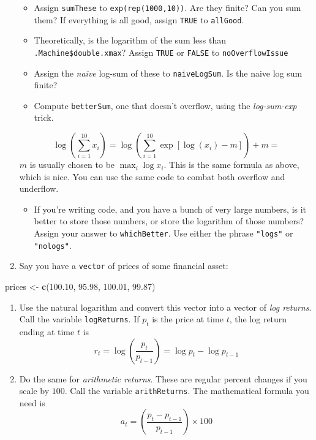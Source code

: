 \documentclass[12pt,krantz2]{krantz}
\makeatletter
\newenvironment{Shaded}{\begin{snugshade}}{\end{snugshade}}
\newcommand{\FloatTok}[1]{\textcolor[rgb]{0.06,0.06,0.06}{#1}}
\newcommand{\KeywordTok}[1]{\textcolor[rgb]{0.27,0.27,0.27}{\textbf{#1}}}
\newcommand{\NormalTok}[1]{#1}
\newcommand{\StringTok}[1]{\textcolor[rgb]{0.5,0.5,0.5}{#1}}
\providecommand{\tightlist}{%
  \setlength{\itemsep}{0pt}\setlength{\parskip}{0pt}}
\newenvironment{kframe}{%
\medskip{}
\setlength{\fboxsep}{.8em}
 \def\at@end@of@kframe{}%
 \ifinner\ifhmode%
  \def\at@end@of@kframe{\end{minipage}}%
  \begin{minipage}{\columnwidth}%
 \fi\fi%
 \def\FrameCommand##1{\hskip\@totalleftmargin \hskip-\fboxsep
 \colorbox{shadecolor}{##1}\hskip-\fboxsep
     \hskip-\linewidth \hskip-\@totalleftmargin \hskip\columnwidth}%
 \MakeFramed {\advance\hsize-\width
   \@totalleftmargin\z@ \linewidth\hsize
   \@setminipage}}%
 {\par\unskip\endMakeFramed%
 \at@end@of@kframe}
\renewenvironment{Shaded}{\begin{kframe}}{\end{kframe}}
\makeatother
\begin{document}
\begin{enumerate}
  \begin{itemize}
  \tightlist
  \item
    Assign \texttt{sumThese} to \texttt{exp(rep(1000,10))}. Are they finite? Can you sum them? If everything is all good, assign \texttt{TRUE} to \texttt{allGood}.
  \item
    Theoretically, is the logarithm of the sum less than \texttt{.Machine\$double.xmax}? Assign \texttt{TRUE} or \texttt{FALSE} to \texttt{noOverflowIssue}
  \item
    Assign the \emph{naive} log-sum of these to \texttt{naiveLogSum}. Is the naive log sum finite?
  \item
    Compute \texttt{betterSum}, one that doesn't overflow, using the \emph{log-sum-exp} trick.
  \end{itemize}

  \[
   \log\left( \sum_{i=1}^{10} x_i \right) = \log\left( \sum_{i=1}^{10} \exp[ \log(x_i) - m] \right) + m = 
   \]
  \(m\) is usually chosen to be \(\max_i \log x_i\). This is the same formula as above, which is nice. You can use the same code to combat both overflow and underflow.

  \begin{itemize}
  \tightlist
  \item
    If you're writing code, and you have a bunch of very large numbers, is it better to store those numbers, or store the logarithm of those numbers? Assign your answer to \texttt{whichBetter}. Use either the phrase \texttt{"logs"} or \texttt{"nologs"}.
  \end{itemize}
\item
  Say you have a \texttt{vector} of prices of some financial asset:
\end{enumerate}

\begin{Shaded}
\begin{Highlighting}[]
\NormalTok{prices <-}\StringTok{ }\KeywordTok{c}\NormalTok{(}\FloatTok{100.10}\NormalTok{, }\FloatTok{95.98}\NormalTok{, }\FloatTok{100.01}\NormalTok{, }\FloatTok{99.87}\NormalTok{)}
\end{Highlighting}
\end{Shaded}

\begin{enumerate}
\def\labelenumi{\alph{enumi}.}
\item
  Use the natural logarithm and convert this vector into a vector of \emph{log returns}. Call the variable \texttt{logReturns}. If \(p_t\) is the price at time \(t\), the log return ending at time \(t\) is
  \begin{equation} 
  r_t = \log \left( \frac{p_t}{p_{t-1}} \right) = \log p_t - \log p_{t-1}
  \end{equation}
\item
  Do the same for \emph{arithmetic returns}. These are regular percent changes if you scale by \(100\). Call the variable \texttt{arithReturns}. The mathematical formula you need is
  \begin{equation} 
  a_t = \left( \frac{p_t - p_{t-1} }{p_{t-1}} \right) \times 100 
  \end{equation}
\end{enumerate}
\end{document}
